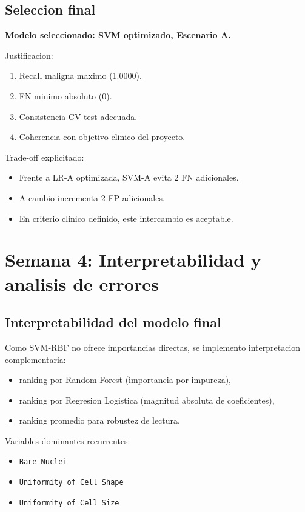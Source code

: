 \documentclass[11pt,a4paper]{article}
\begin{document}
\subsection{Seleccion final}

\textbf{Modelo seleccionado: SVM optimizado, Escenario A.}

Justificacion:

\begin{enumerate}[leftmargin=1.2cm]
\item Recall maligna maximo (1.0000).
\item FN minimo absoluto (0).
\item Consistencia CV-test adecuada.
\item Coherencia con objetivo clinico del proyecto.
\end{enumerate}

Trade-off explicitado:

\begin{itemize}[leftmargin=1.2cm]
\item Frente a LR-A optimizada, SVM-A evita 2 FN adicionales.
\item A cambio incrementa 2 FP adicionales.
\item En criterio clinico definido, este intercambio es aceptable.
\end{itemize}

\section{Semana 4: Interpretabilidad y analisis de errores}

\subsection{Interpretabilidad del modelo final}

Como SVM-RBF no ofrece importancias directas, se implemento interpretacion complementaria:

\begin{itemize}[leftmargin=1.2cm]
\item ranking por Random Forest (importancia por impureza),
\item ranking por Regresion Logistica (magnitud absoluta de coeficientes),
\item ranking promedio para robustez de lectura.
\end{itemize}

Variables dominantes recurrentes:

\begin{itemize}[leftmargin=1.2cm]
\item \texttt{Bare Nuclei}
\item \texttt{Uniformity of Cell Shape}
\item \texttt{Uniformity of Cell Size}
\end{itemize}
\end{document}
